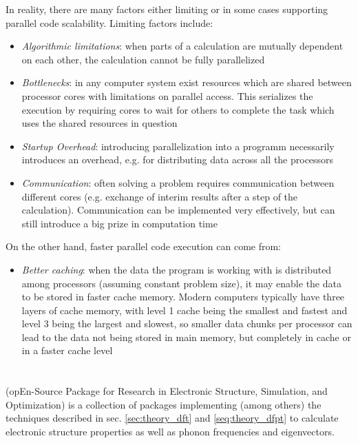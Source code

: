\documentclass[main.tex]{subfiles}
\begin{document}
In reality, there are many factors either limiting or in some cases supporting parallel code scalability. Limiting factors include:
\begin{itemize}
    \item \emph{Algorithmic limitations}: when parts of a calculation are mutually dependent on each other, the calculation cannot be fully parallelized
    \item \emph{Bottlenecks}: in any computer system exist resources which are shared between processor cores with limitations on parallel access. This serializes the execution by requiring cores to wait for others to complete the task which uses the shared resources in question
    \item \emph{Startup Overhead}: introducing parallelization into a programm necessarily introduces an overhead, e.g. for distributing data across all the processors
    \item \emph{Communication}: often solving a problem requires communication between different cores (e.g. exchange of interim results after a step of the calculation). Communication can be implemented very effectively, but can still introduce a big prize in computation time
\end{itemize}
On the other hand, faster parallel code execution can come from:
\begin{itemize}
    \item \emph{Better caching}: when the data the program is working with is distributed among processors (assuming constant problem size), it may enable the data to be stored in faster cache memory. Modern computers typically have three layers of cache memory, with level 1 cache being the smallest and fastest and level 3 being the largest and slowest, so smaller data chunks per processor can lead to the data not being stored in main memory, but completely in cache or in a faster cache level
\end{itemize}


\section{\QE}\label{sec:qe}

\QE (opEn-Source Package for Research in Electronic Structure, Simulation, and Optimization) \cite{giannozzi_quantum_2009,giannozzi_advanced_2017} is a collection of packages implementing (among others) the techniques described in sec. \ref{sec:theory_dft} and \ref{seq:theory_dfpt} to calculate electronic structure properties as well as phonon frequencies and eigenvectors.
\end{document}
